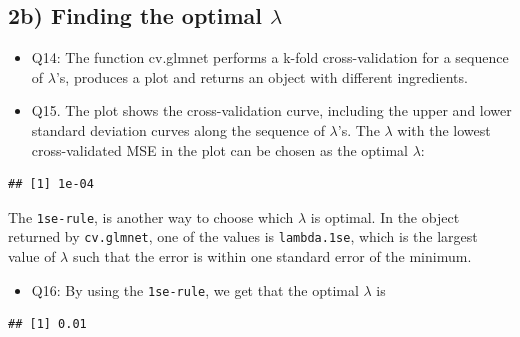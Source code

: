 \documentclass[]{article}
\newenvironment{Shaded}{\begin{snugshade}}{\end{snugshade}}
\newcommand{\OperatorTok}[1]{\textcolor[rgb]{0.81,0.36,0.00}{\textbf{#1}}}
\newcommand{\NormalTok}[1]{#1}
\providecommand{\tightlist}{%
  \setlength{\itemsep}{0pt}\setlength{\parskip}{0pt}}
\begin{document}
\subsection{\texorpdfstring{2b) Finding the optimal
\(\lambda\)}{2b) Finding the optimal \textbackslash{}lambda}}\label{b-finding-the-optimal-lambda}

\begin{itemize}
\item
  Q14: The function cv.glmnet performs a k-fold cross-validation for a
  sequence of \(\lambda\)'s, produces a plot and returns an object with
  different ingredients.
\item
  Q15. The plot shows the cross-validation curve, including the upper
  and lower standard deviation curves along the sequence of
  \(\lambda\)'s. The \(\lambda\) with the lowest cross-validated MSE in
  the plot can be chosen as the optimal \(\lambda\):
\end{itemize}

\begin{Shaded}
\end{Shaded}

\begin{verbatim}
## [1] 1e-04
\end{verbatim}

The \texttt{1se-rule}, is another way to choose which \(\lambda\) is
optimal. In the object returned by \texttt{cv.glmnet}, one of the values
is \texttt{lambda.1se}, which is the largest value of \(\lambda\) such
that the error is within one standard error of the minimum.

\begin{itemize}
\tightlist
\item
  Q16: By using the \texttt{1se-rule}, we get that the optimal
  \(\lambda\) is
\end{itemize}

\begin{Shaded}
\end{Shaded}

\begin{verbatim}
## [1] 0.01
\end{verbatim}
\end{document}

